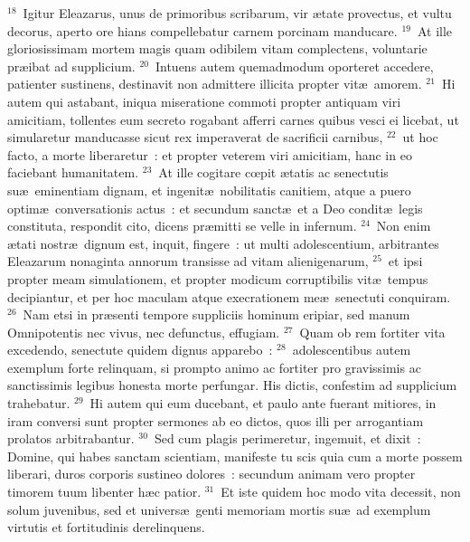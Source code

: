 ${}^{18}$~Igitur Eleazarus, unus de primoribus scribarum, vir \ae tate provectus, et vultu decorus, aperto ore hians compellebatur carnem porcinam manducare.
${}^{19}$~At ille gloriosissimam mortem magis quam odibilem vitam complectens, voluntarie pr\ae ibat ad supplicium.
${}^{20}$~Intuens autem quemadmodum oporteret accedere, patienter sustinens, destinavit non admittere illicita propter vit\ae\ amorem.
${}^{21}$~Hi autem qui astabant, iniqua miseratione commoti propter antiquam viri amicitiam, tollentes eum secreto rogabant afferri carnes quibus vesci ei licebat, ut simularetur manducasse sicut rex imperaverat de sacrificii carnibus,
${}^{22}$~ut hoc facto, a morte liberaretur~: et propter veterem viri amicitiam, hanc in eo faciebant humanitatem.
${}^{23}$~At ille cogitare cœpit \ae tatis ac senectutis su\ae\ eminentiam dignam, et ingenit\ae\ nobilitatis canitiem, atque a puero optim\ae\ conversationis actus~: et secundum sanct\ae\ et a Deo condit\ae\ legis constituta, respondit cito, dicens pr\ae mitti se velle in infernum.
${}^{24}$~Non enim \ae tati nostr\ae\ dignum est, inquit, fingere~: ut multi adolescentium, arbitrantes Eleazarum nonaginta annorum transisse ad vitam alienigenarum,
${}^{25}$~et ipsi propter meam simulationem, et propter modicum corruptibilis vit\ae\ tempus decipiantur, et per hoc maculam atque execrationem me\ae\ senectuti conquiram.
${}^{26}$~Nam etsi in pr\ae senti tempore suppliciis hominum eripiar, sed manum Omnipotentis nec vivus, nec defunctus, effugiam.
${}^{27}$~Quam ob rem fortiter vita excedendo, senectute quidem dignus apparebo~:
${}^{28}$~adolescentibus autem exemplum forte relinquam, si prompto animo ac fortiter pro gravissimis ac sanctissimis legibus honesta morte perfungar. His dictis, confestim ad supplicium trahebatur.
${}^{29}$~Hi autem qui eum ducebant, et paulo ante fuerant mitiores, in iram conversi sunt propter sermones ab eo dictos, quos illi per arrogantiam prolatos arbitrabantur.
${}^{30}$~Sed cum plagis perimeretur, ingemuit, et dixit~: Domine, qui habes sanctam scientiam, manifeste tu scis quia cum a morte possem liberari, duros corporis sustineo dolores~: secundum animam vero propter timorem tuum libenter h\ae c patior.
${}^{31}$~Et iste quidem hoc modo vita decessit, non solum juvenibus, sed et univers\ae\ genti memoriam mortis su\ae\ ad exemplum virtutis et fortitudinis derelinquens.

